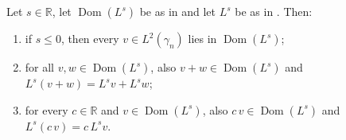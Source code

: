 \begin{lemma}
Let $s \in \mathbb{R}$, let $\operatorname{Dom}(L^s)$ be as in
 and let $L^s$ be as in .  Then:
\begin{enumerate}
\item if $s \leq 0$, then every $v \in L^2(\gamma_n)$ lies in
$\operatorname{Dom}(L^s)$;
\item for all $v, w \in \operatorname{Dom}(L^s)$, also
$v + w \in \operatorname{Dom}(L^s)$ and $L^s(v+w) = L^s v + L^s w$;
\item for every $c \in \mathbb{R}$ and $v \in \operatorname{Dom}(L^s)$, also
$c\,v \in \operatorname{Dom}(L^s)$ and $L^s(c\,v) = c\,L^s v$.
\end{enumerate}
\end{lemma}
